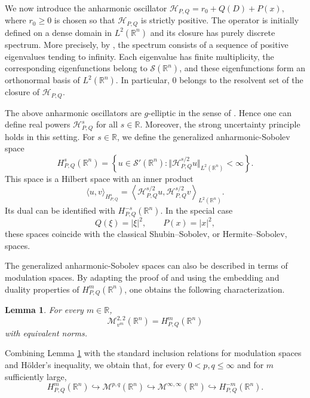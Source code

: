 \documentclass[12pt, reqno]{amsart}
\newtheorem{lemma}[theorem]{Lemma}
\theoremstyle{definition}
\theoremstyle{remark}
\numberwithin{equation}{section}
\begin{document}
We now introduce the anharmonic oscillator $\mathcal H_{P,Q} =
    r_0+Q(D)+P(x),$
where $r_0\geq0$ is chosen so that $\mathcal H_{P,Q}$ is strictly positive. The operator is initially defined on a dense domain in $L^2(\mathbb R^n)$ and its closure has purely discrete spectrum. More precisely, by \cite[Theorem 4.2.9]{NicolaRodino}, the spectrum consists of a sequence of positive eigenvalues tending to infinity. Each eigenvalue has finite multiplicity, the corresponding eigenfunctions belong to $\mathcal S(\mathbb R^n)$, and these eigenfunctions form an orthonormal basis of $L^2(\mathbb R^n)$. In particular, $0$ belongs to the resolvent set of the closure of $\mathcal H_{P,Q}$.

The above anharmonic oscillators are $g$-elliptic in the sense of \cite{bufa:hy}. Hence one can define real powers $\mathcal H_{P,Q}^s$ for all $s\in\mathbb R$. Moreover, the strong uncertainty principle holds in this setting. For $s\in\mathbb R$, we define the generalized anharmonic-Sobolev space
\[
    H_{P,Q}^s(\mathbb R^n)
    =
    \left\{
    u\in\mathcal S'(\mathbb R^n):
    \Vert \mathcal H_{P,Q}^{s/2}u\Vert_{L^2(\mathbb R^n)}<\infty
    \right\}.
\]
This space is a Hilbert space with an inner product
\[
    \langle u,v\rangle_{H_{P,Q}^s}
    =
    \left\langle
    \mathcal H_{P,Q}^{s/2}u,
    \mathcal H_{P,Q}^{s/2}v
    \right\rangle_{L^2(\mathbb R^n)} .
\]
Its dual can be identified with $H_{P,Q}^{-s}(\mathbb R^n)$. In the special case
\[
    Q(\xi)=|\xi|^2,\qquad P(x)=|x|^2,
\]
these spaces coincide with the classical Shubin--Sobolev, or Hermite--Sobolev, spaces.

The generalized anharmonic-Sobolev spaces can also be described in terms of modulation spaces. By adapting the proof of \cite[Lemma 4.4.19]{ElenaRodino} and using the embedding and duality properties of $H_{P,Q}^m(\mathbb R^n)$, one obtains the following characterization.

\begin{lemma}
\label{char:ansobo}
For every $m\in\mathbb R$,
\[
    \mathcal M_{v^m}^{2,2}(\mathbb R^n)
    =
    H_{P,Q}^m(\mathbb R^n)
\]
with equivalent norms.
\end{lemma}

Combining Lemma \ref{char:ansobo} with the standard inclusion relations for modulation spaces and H\"older's inequality, we obtain that, for every $0<p,q\leq\infty$ and for $m$ sufficiently large,
\begin{equation}
\label{embeddings}
    H_{P,Q}^m(\mathbb R^n)
    \hookrightarrow
    \mathcal M^{p,q}(\mathbb R^n)
    \hookrightarrow
    \mathcal M^{\infty,\infty}(\mathbb R^n)
    \hookrightarrow
    H_{P,Q}^{-m}(\mathbb R^n).
\end{equation}
\end{document}
